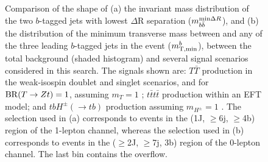 \begin{figure}[h!]
\captionsetup{width=0.85\textwidth} \caption{\small Comparison of the shape of (a) the invariant mass distribution of the two $b$-tagged jets with lowest $\Delta$R separation ($m_{b\bar{b}}^{{\rm min}\Delta R}$), and (b) the distribution of the minimum transverse mass between \MET and any of the three leading $b$-tagged jets in the event ($m_{\rm T,min}^b$), between the total background (shaded histogram) and several signal scenarios considered in this search. The signals shown are: $T\bar{T}$ production in the weak-isospin doublet and singlet scenarios, and for ${\rm BR}(T\to Zt) = 1$, assuming $m_{T} = 1$ \tev; $t\bar{t}t\bar{t}$ production within an EFT model; and $tbH^{\pm}(\to tb)$ production assuming $m_{H^{\pm}} = 1$ \tev. The selection used in (a) corresponds to events in the (1J, $\ge$6j, $\ge$4b) region of the 1-lepton channel, whereas the selection used in (b) corresponds to events in the ($\ge$2J, $\ge$7j, 3b) region of the 0-lepton channel. The last bin contains the overflow.}
\label{fig:vlq:str:addvar}
\end{figure}

